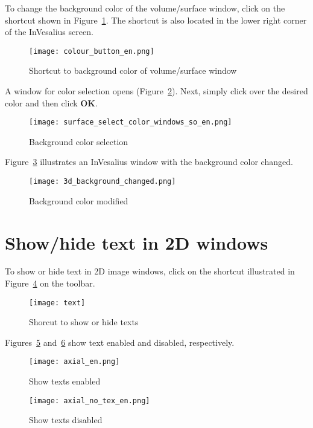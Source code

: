 To change the background color of the volume/surface window, click on the shortcut shown in Figure~\ref{fig:button_select_color_2}. The shortcut is also located in the lower right corner of the InVesalius screen.

\begin{figure}[!htb]
\centering
\texttt{[image: colour\_button\_en.png]}
\caption{Shortcut to background color of volume/surface window}
\label{fig:button_select_color_2}
\end{figure}

A window for color selection opens (Figure~\ref{fig:color_window_background}). Next, simply click over the desired color and then click \textbf{OK}.

\begin{figure}[!htb]
\centering
\texttt{[image: surface\_select\_color\_windows\_so\_en.png]}
\caption{Background color selection}
\label{fig:color_window_background}
\end{figure}

Figure~\ref{fig:background_color} illustrates an InVesalius window with the background color changed.

\begin{figure}[!htb]
\centering
\texttt{[image: 3d\_background\_changed.png]}
\caption{Background color modified}
\label{fig:background_color}
\end{figure}

\newpage

\section{Show/hide text in 2D windows}

To show or hide text in 2D image windows, click on the shortcut illustrated in Figure~\ref{fig:text} on the toolbar.

\begin{figure}[!htb]
\centering
\texttt{[image: text]}
\caption{Shorcut to show or hide texts}
\label{fig:text}
\end{figure}

Figures~\ref{fig:text_on} and~\ref{fig:text_off} show text enabled and disabled, respectively.

\begin{figure}[!htb]
\centering
\texttt{[image: axial\_en.png]}
\caption{Show texts enabled}
\label{fig:text_on}
\end{figure}

\begin{figure}[!htb]
\centering
\texttt{[image: axial\_no\_tex\_en.png]}
\caption{Show texts disabled}
\label{fig:text_off}
\end{figure}
